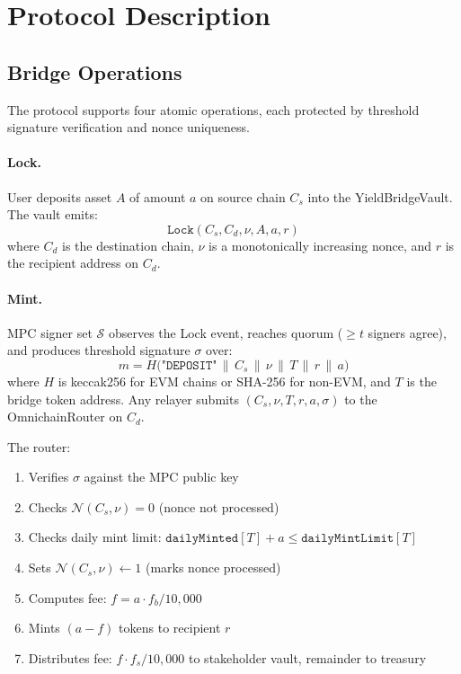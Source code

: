\section{Protocol Description}

\label{sec:protocol}

\subsection{Bridge Operations}

The protocol supports four atomic operations, each protected by threshold signature verification and nonce uniqueness.

\paragraph{Lock.} User deposits asset $A$ of amount $a$ on source chain $C_s$ into the YieldBridgeVault. The vault emits:
\[
  \texttt{Lock}(C_s, C_d, \nu, A, a, r)
\]
where $C_d$ is the destination chain, $\nu$ is a monotonically increasing nonce, and $r$ is the recipient address on $C_d$.

\paragraph{Mint.} MPC signer set $\mathcal{S}$ observes the Lock event, reaches quorum ($\geq t$ signers agree), and produces threshold signature $\sigma$ over:
\begin{equation}
  \label{eq:deposit-msg}
  m = H\bigl(\texttt{"DEPOSIT"} \,\|\, C_s \,\|\, \nu \,\|\, T \,\|\, r \,\|\, a\bigr)
\end{equation}
where $H$ is keccak256 for EVM chains or SHA-256 for non-EVM, and $T$ is the bridge token address. Any relayer submits $(C_s, \nu, T, r, a, \sigma)$ to the OmnichainRouter on $C_d$.

The router:
\begin{enumerate}[nosep]
  \item Verifies $\sigma$ against the MPC public key
  \item Checks $\mathcal{N}(C_s, \nu) = 0$ (nonce not processed)
  \item Checks daily mint limit: $\texttt{dailyMinted}[T] + a \leq \texttt{dailyMintLimit}[T]$
  \item Sets $\mathcal{N}(C_s, \nu) \leftarrow 1$ (marks nonce processed)
  \item Computes fee: $f = a \cdot f_b / 10{,}000$
  \item Mints $(a - f)$ tokens to recipient $r$
  \item Distributes fee: $f \cdot f_s / 10{,}000$ to stakeholder vault, remainder to treasury
\end{enumerate}

